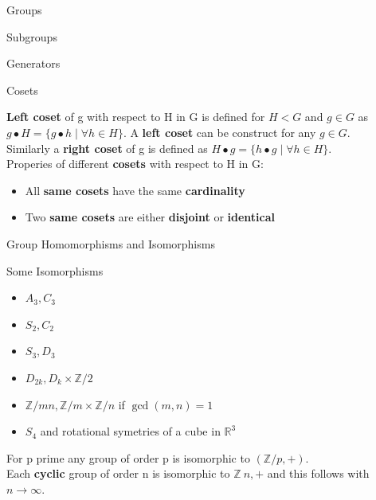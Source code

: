 \documentclass[12pt, letterpaper]{article}
\begin{document}
\begin{section}{Groups}
\begin{subsection}{Subgroups}
\begin{subsubsection}{Generators}
    \end{subsubsection}

  \end{subsection}

  \begin{subsection}{Cosets}

    \textbf{Left coset} of g with respect to H in G is defined for \(H < G\)
    and \(g \in G\) as \(g \bullet H = \{{} g \bullet h \; | \; \forall h \in H \}{}\).
    A \textbf{left coset} can be construct for any \(g \in G\). \\
    Similarly a \textbf{right coset} of g is defined as
    \(H \bullet g = \{{} h \bullet g \; | \; \forall h \in H \}{}\). \\
    Properies of different \textbf{cosets} with respect to H in G:
    \begin{itemize}
      \item All \textbf{same cosets} have the same \textbf{cardinality}
      \item Two \textbf{same cosets} are either \textbf{disjoint} or \textbf{identical}
    \end{itemize}

  \end{subsection}

  \begin{subsection}{Group Homomorphisms and Isomorphisms}

    \begin{subsubsection}{Some Isomorphisms}

      \begin{itemize}
        \item \(A_{3}, C_{3}\)
        \item \(S_{2}, C_{2}\)
        \item \(S_{3}, D_{3}\)
        \item \(D_{2k}, D_{k} \times \mathbb{Z} / 2\)
        \item \(\mathbb{Z} / mn, \mathbb{Z} / m \times \mathbb{Z} / n\) if \(\gcd(m, n) = 1\)
        \item \(S_{4}\) and rotational symetries of a cube in \(\mathbb{R}^{3}\)
      \end{itemize}

      For p prime any group of order p is isomorphic to \((\mathbb{Z} / p, +)\). \\
      Each \textbf{cyclic} group of order n is isomorphic to \(\mathbb{Z} \ n, +\)
      and this follows with \(n \to \infty\).


\end{subsubsection}
\end{subsection}
\end{section}
\end{document}
